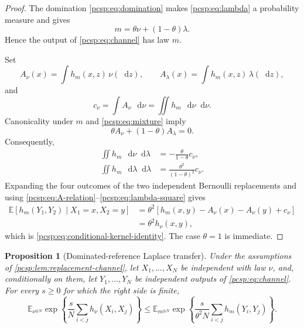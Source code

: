 \documentclass[11pt,reqno]{amsart}
\numberwithin{equation}{section}
\theoremstyle{plain}
\newtheorem{prop}[prop]{Proposition}
\theoremstyle{definition}
\newcommand{\dd}{\mathop{}\!\mathrm d}
\newcommand{\E}{\mathbb E}
\begin{document}
\begin{proof}
The domination \eqref{pcsp:eq:domination} makes \eqref{pcsp:eq:lambda} a probability measure and gives
\begin{equation}\label{pcsp:eq:mixture}
 m=\theta\nu+(1-\theta)\lambda.
\end{equation}
Hence the output of \eqref{pcsp:eq:channel} has law $m$.

Set
\begin{equation}\label{pcsp:eq:A-nu-lambda}
 A_\nu(x)=\int h_m(x,z)\,\nu(\dd z),
 \qquad
 A_\lambda(x)=\int h_m(x,z)\,\lambda(\dd z),
\end{equation}
and
\begin{equation}\label{pcsp:eq:c-nu}
 c_\nu=\int A_\nu\,\dd\nu=\iint h_m\,\dd\nu\dd\nu.
\end{equation}
Canonicality under $m$ and \eqref{pcsp:eq:mixture} imply
\begin{equation}\label{pcsp:eq:A-relation}
 \theta A_\nu+(1-\theta)A_\lambda=0.
\end{equation}
Consequently,
\begin{align}
 \iint h_m\,\dd\nu\dd\lambda
 &=-\frac\theta{1-\theta}c_\nu,
 \label{pcsp:eq:cross-mixture}\\
 \iint h_m\,\dd\lambda\dd\lambda
 &=\frac{\theta^2}{(1-\theta)^2}c_\nu.
 \label{pcsp:eq:lambda-square}
\end{align}
Expanding the four outcomes of the two independent Bernoulli replacements and using \eqref{pcsp:eq:A-relation}--\eqref{pcsp:eq:lambda-square} gives
\begin{align}
 \E[h_m(Y_1,Y_2)\mid X_1=x,X_2=y]
 &=\theta^2\left[h_m(x,y)-A_\nu(x)-A_\nu(y)+c_\nu\right]
 \label{pcsp:eq:channel-expansion}\\
 &=\theta^2h_\nu(x,y),
 \label{pcsp:eq:channel-expansion-final}
\end{align}
which is \eqref{pcsp:eq:conditional-kernel-identity}.  The case $\theta=1$ is immediate.
\end{proof}

\begin{prop}[Dominated-reference Laplace transfer]\label{pcsp:prop:laplace-transfer}
Under the assumptions of \cref{pcsp:lem:replacement-channel}, let $X_1,\ldots,X_N$ be independent with law $\nu$, and, conditionally on them, let $Y_1,\ldots,Y_N$ be independent outputs of \eqref{pcsp:eq:channel}.  For every $s\geq0$ for which the right side is finite,
\begin{equation}\label{pcsp:eq:abstract-laplace-transfer}
 \E_{\nu^{\otimes N}}\exp\left\{
 \frac sN\sum_{i<j}h_\nu(X_i,X_j)\right\}
 \leq
 \E_{m^{\otimes N}}\exp\left\{
 \frac{s}{\theta^2N}\sum_{i<j}h_m(Y_i,Y_j)\right\}.
\end{equation}
\end{prop}
\end{document}
